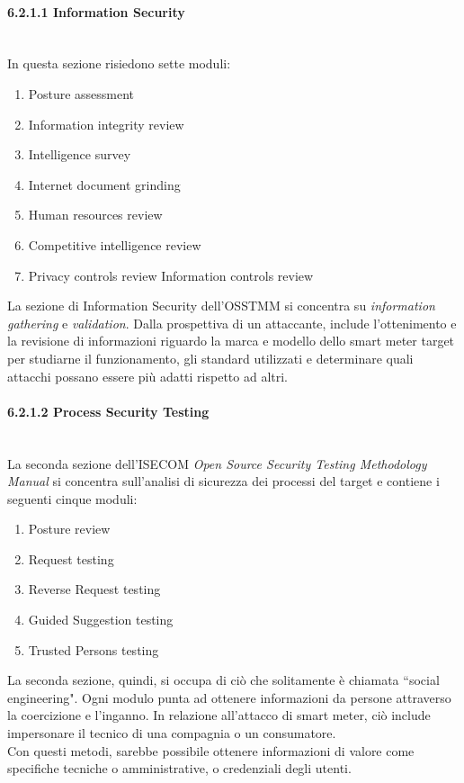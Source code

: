 \paragraph{6.2.1.1 Information Security}\mbox{}\\
In questa sezione risiedono sette moduli:
\begin{enumerate}
	\item Posture assessment
	\item Information integrity review
	\item Intelligence survey
	\item Internet document grinding
	\item Human resources review
	\item Competitive intelligence review
	\item Privacy controls review
	Information controls review
\end{enumerate}
La sezione di Information Security dell'OSSTMM si concentra su \emph{information gathering} e \emph{validation}. Dalla prospettiva di un attaccante, include l'ottenimento e la revisione di informazioni riguardo la marca e modello dello smart meter target per studiarne il funzionamento, gli standard utilizzati e determinare quali attacchi possano essere più adatti rispetto ad altri.


\paragraph{6.2.1.2 Process Security Testing}\mbox{}\\
La seconda sezione dell'ISECOM \emph{Open Source Security Testing Methodology Manual} si concentra sull'analisi di sicurezza dei processi del target e contiene i seguenti cinque moduli:
\begin{enumerate}
	\item Posture review
	\item Request testing
	\item Reverse Request testing
	\item Guided Suggestion testing
	\item Trusted Persons testing
\end{enumerate}

La seconda sezione, quindi, si occupa di ciò che solitamente è chiamata ``social engineering". Ogni modulo punta ad ottenere informazioni da persone attraverso la coercizione e l'inganno. In relazione all'attacco di smart meter, ciò include impersonare il tecnico di una compagnia o un consumatore.\\
Con questi metodi, sarebbe possibile ottenere informazioni di valore come specifiche tecniche o amministrative, o credenziali degli utenti.

